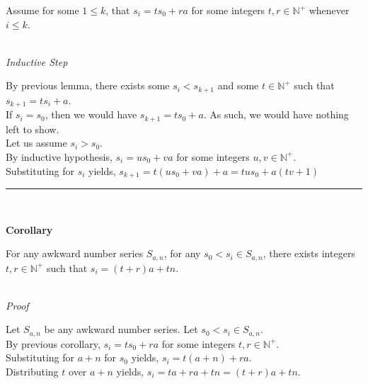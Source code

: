 \documentclass[a4paper,12pt]{article}
\begin{document}
\noindent Assume for some $1 \leq k$, that $s_i = ts_0 + ra$ for some integers $t, r \in \mathbb{N}^+$ whenever $i \leq k$.


\noindent  \\
\textit{Inductive Step}

\noindent By previous lemma, there exists some $s_i < s_{k+1}$ and some $t \in \mathbb{N}^+$ such that $s_{k+1} = ts_i + a$.\\


\noindent If $s_i = s_0$, then we would have $s_{k+1} = ts_0 + a$. As such, we would have nothing left to show.\\

\noindent Let us assume $s_i > s_0$.\\

\noindent By inductive hypothesis, $s_i = us_0 + va$ for some integers $u, v \in \mathbb{N}^+$.\\

\noindent Substituting for $s_i$ yields, $s_{k + 1} = t(us_0 + va) + a = tus_0 + a(tv + 1)$


\begin{center}
\noindent\rule{8cm}{0.4pt}
\end{center}
\noindent \\








\label{corollary:relation_to_initial_p2}
\hypertarget{corollary:relation_to_initial_p2}{}
\begin{tcolorbox}
\textbf{Corollary}

For any awkward number series $S_{a,n}$, for any $s_0 < s_i \in S_{a,n}$, there exists integers $t, r \in \mathbb{N}^+$ such that $s_i = (t + r)a + tn$.

\end{tcolorbox}


\noindent \\
\textit{Proof}

\noindent Let $S_{a,n}$ be any awkward number series. Let $s_0 < s_i \in S_{a, n}$.\\

\noindent By previous corollary, $s_i = ts_0 + ra$ for some integers $t, r \in \mathbb{N}^+$.\\

\noindent Substituting for $a + n$ for $s_0$ yields, $s_i = t(a + n) + ra$.\\

\noindent Distributing $t$ over $a + n$ yields, $s_i = ta + ra + tn = (t + r)a + tn$.
\end{document}
